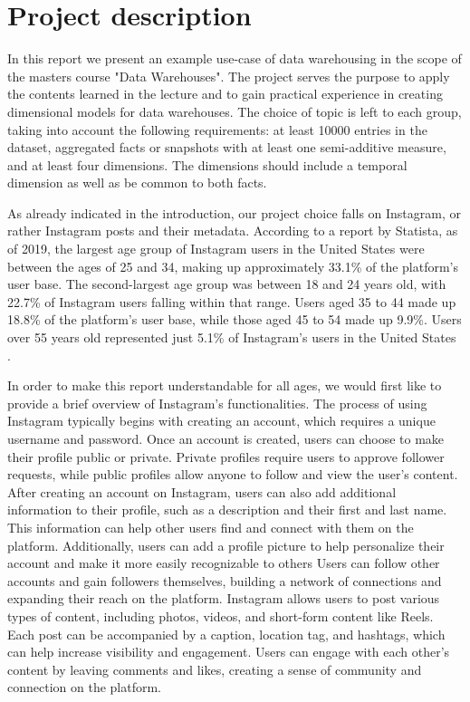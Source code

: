 \documentclass[conference]{IEEEtran}
\begin{document}
\section{Project description}
In this report we present an example use-case of data warehousing in the scope of the masters course "Data Warehouses". The project serves the purpose to apply the contents learned in the lecture and to gain practical experience in creating dimensional models for data warehouses. The choice of topic is left to each group, taking into account the following requirements: at least 10000 entries in the dataset, aggregated facts or snapshots with at least one semi-additive measure, and at least four dimensions. The dimensions should include a temporal dimension as well as be common to both facts.

As already indicated in the introduction, our project choice falls on Instagram, or rather Instagram posts and their metadata. According to a report by Statista, as of 2019, the largest age group of Instagram users in the United States were between the ages of 25 and 34, making up approximately 33.1\% of the platform's user base. The second-largest age group was between 18 and 24 years old, with 22.7\% of Instagram users falling within that range. Users aged 35 to 44 made up 18.8\% of the platform's user base, while those aged 45 to 54 made up 9.9\%. Users over 55 years old represented just 5.1\% of Instagram's users in the United States \cite{Statista2021}.

In order to make this report understandable for all ages, we would first like to provide a brief overview of Instagram's functionalities. The process of using Instagram typically begins with creating an account, which requires a unique username and password. Once an account is created, users can choose to make their profile public or private. Private profiles require users to approve follower requests, while public profiles allow anyone to follow and view the user's content. After creating an account on Instagram, users can also add additional information to their profile, such as a description and their first and last name. This information can help other users find and connect with them on the platform. Additionally, users can add a profile picture to help personalize their account and make it more easily recognizable to others
Users can follow other accounts and gain followers themselves, building a network of connections and expanding their reach on the platform. Instagram allows users to post various types of content, including photos, videos, and short-form content like Reels. Each post can be accompanied by a caption, location tag, and hashtags, which can help increase visibility and engagement.
Users can engage with each other's content by leaving comments and likes, creating a sense of community and connection on the platform. 
\end{document}
